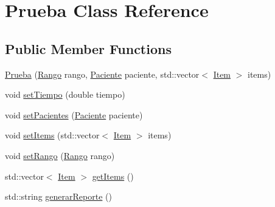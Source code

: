 \hypertarget{class_prueba}{\section{Prueba Class Reference}
\label{class_prueba}
}
\subsection*{Public Member Functions}
\begin{DoxyCompactItemize}
\item 
\hyperlink{class_prueba_a01c77dc54f08cb4098b38167e48b5e04}{Prueba} (\hyperlink{class_rango}{Rango} rango, \hyperlink{class_paciente}{Paciente} paciente, std\+::vector$<$ \hyperlink{class_item}{Item} $>$ items)
\item 
void \hyperlink{class_prueba_a0800d446de537a615de474c270bebd75}{set\+Tiempo} (double tiempo)
\item 
void \hyperlink{class_prueba_ac45d0bc033c8f2b1fd25f10537328ae4}{set\+Pacientes} (\hyperlink{class_paciente}{Paciente} paciente)
\item 
void \hyperlink{class_prueba_a0b3baf595028b7aa32b95e2c3c2729ea}{set\+Items} (std\+::vector$<$ \hyperlink{class_item}{Item} $>$ items)
\item 
void \hyperlink{class_prueba_a682b5c82a1b41741c4e578b63b4b40bd}{set\+Rango} (\hyperlink{class_rango}{Rango} rango)
\item 
std\+::vector$<$ \hyperlink{class_item}{Item} $>$ \hyperlink{class_prueba_ae9c322c5cda5e7f75fb0d22520a57f06}{get\+Items} ()
\item 
std\+::string \hyperlink{class_prueba_aa81709ee71b93659f5a2826d3da7c182}{generar\+Reporte} ()
\end{DoxyCompactItemize}



